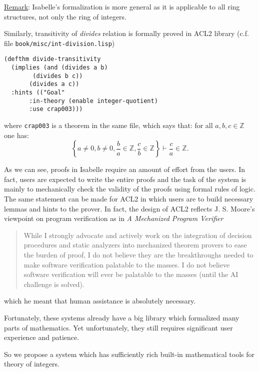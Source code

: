 \documentclass[12pt]{article}
\begin{document}
\underline{Remark}: Isabelle's formalization is more general as it is applicable to all ring structures, not only the ring of integers.

Similarly, transitivity of \emph{divides} relation is formally proved in ACL2 library (c.f. file \texttt{book/misc/int-division.lisp})
\begin{lstlisting}
(defthm divide-transitivity
  (implies (and (divides a b)
		(divides b c))
	   (divides a c))
  :hints (("Goal"
	   :in-theory (enable integer-quotient)
	   :use crap003)))
\end{lstlisting}
\newcommand{\setZ}{\mathbb{Z}}
where \texttt{crap003} is a theorem in the same file, which says that: for all $a,b,c \in \setZ$ one has:
$$\left\{ a \not= 0, b \not= 0, \frac{b}{a} \in \setZ,\frac{c}{b} \in \setZ \right\} \vdash \frac{c}{a} \in \setZ.$$

As we can see, proofs in Isabelle require an amount of effort from the users. In fact, users are expected to write the entire proofs and the task of the system is mainly to mechanically check the validity of the proofs using formal rules of logic. The same statement can be made for ACL2 in which users are to build necessary lemmas and hints to the prover. In fact, the design of ACL2 reflects J. S. Moore's viewpoint on program verification as in \emph{A Mechanized Program Veriﬁer}
\begin{quote}
\scriptsize{While I strongly advocate and actively work on the integration of decision procedures and static
analyzers into mechanized theorem provers to ease the burden of proof, I do not believe they are
the breakthroughs needed to make software verification palatable to the masses. I do not believe
software verification will ever be palatable to the masses (until the AI challenge is solved).}
\end{quote}
which he meant that human assistance is absolutely necessary.

Fortunately, these systems already have a big library which formalized many parts of mathematics. Yet unfortunately, they still requires significant user experience and patience.


So we propose a system which has sufficiently rich built-in mathematical tools for theory of integers.
\end{document}
